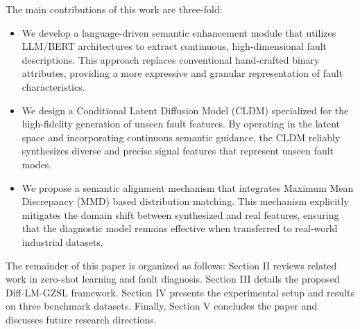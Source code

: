 The main contributions of this work are three-fold:
\begin{itemize}
    \item We develop a language-driven semantic enhancement module that utilizes LLM/BERT architectures to extract continuous, high-dimensional fault descriptions. This approach replaces conventional hand-crafted binary attributes, providing a more expressive and granular representation of fault characteristics.
    \item We design a Conditional Latent Diffusion Model (CLDM) specialized for the high-fidelity generation of unseen fault features. By operating in the latent space and incorporating continuous semantic guidance, the CLDM reliably synthesizes diverse and precise signal features that represent unseen fault modes.
    \item We propose a semantic alignment mechanism that integrates Maximum Mean Discrepancy (MMD) based distribution matching. This mechanism explicitly mitigates the domain shift between synthesized and real features, ensuring that the diagnostic model remains effective when transferred to real-world industrial datasets.
\end{itemize}

The remainder of this paper is organized as follows: Section II reviews related work in zero-shot learning and fault diagnosis. Section III details the proposed Diff-LM-GZSL framework. Section IV presents the experimental setup and results on three benchmark datasets. Finally, Section V concludes the paper and discusses future research directions.